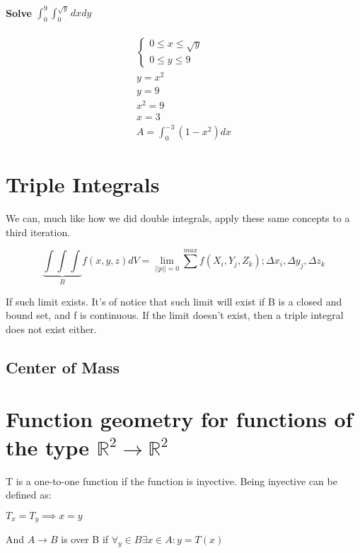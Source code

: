 \documentclass[11pt,fleqn]{book} %
\begin{document}
\paragraph*{Solve $\int_{0}^9\int_0^{\sqrt{y}} dxdy$}
\begin{gather}
    \begin{cases}
        0 \leq x \leq \sqrt{y} \\
        0 \leq y \leq 9
    \end{cases} \\
    y = x^2 \\
    y = 9 \\
    x^2 = 9 \\
    x = 3 \\
    A = \int_0^{-3} (1-x^2) dx
\end{gather}

\section{Triple Integrals}

We can, much like how we did double integrals, apply these same concepts to a third iteration.

\begin{equation}
    \underbrace{\int\int\int}_{B} f(x,y,z) dV = \lim_{||p|| = 0} \sum_{}^{max} f(X_i,Y_j,Z_k); \Delta x_i, \Delta y_j, \Delta z_k
\end{equation}

If such limit exists. It's of notice that such limit will exist if B is a closed and bound set, and f is continuous.
If the limit doesn't exist, then a triple integral does not exist either.

\subsection{Center of Mass}



\section{Function geometry for functions of the type $\mathbb{R}^2 \to \mathbb{R}^2$}

T is a one-to-one function if the function is inyective. Being inyective can be defined as:

$T_x = T_y \implies x=y$

And $ A \to B $ is over B if $ \forall_y \in B \exists x \in A : y = T(x) $
\end{document}
